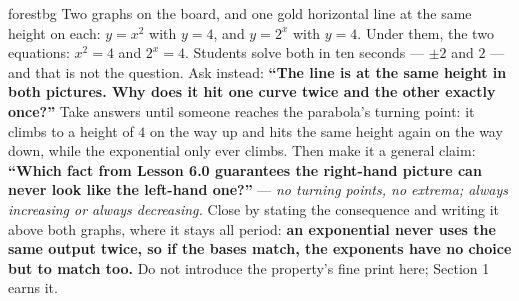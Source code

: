 \documentclass[10pt]{article}
\begin{document}
\begin{skillbox}[Hook]{forestbg}
    Two graphs on the board, and one gold horizontal line at the same height on each: $y=x^{2}$ with
    $y=4$, and $y=2^{x}$ with $y=4$. Under them, the two equations: \textbf{$x^{2}=4$} and
    \textbf{$2^{x}=4$}. Students solve both in ten seconds --- $\pm2$ and $2$ --- and that is not the
    question. Ask instead: \textbf{``The line is at the same height in both pictures. Why does it hit
    one curve twice and the other exactly once?''} Take answers until someone reaches the parabola's
    turning point: it climbs to a height of $4$ on the way up and hits the same height again on the way
    down, while the exponential only ever climbs. Then make it a general claim: \textbf{``Which fact
    from Lesson 6.0 guarantees the right-hand picture can never look like the left-hand one?''} ---
    \emph{no turning points, no extrema; always increasing or always decreasing.} Close by stating the
    consequence and writing it above both graphs, where it stays all period: \textbf{an exponential
    never uses the same output twice, so if the bases match, the exponents have no choice but to match
    too.} Do not introduce the property's fine print here; Section 1 earns it.
\end{skillbox}
\end{document}
